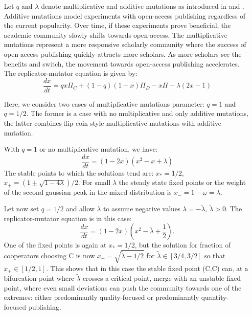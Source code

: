\documentclass[amsfonts, amssymb, prl, superscriptaddress, notitlepage, twocolumn, nofootinbib]{revtex4-2}
\begin{document}
Let $q$ and $\lambda$ denote multiplicative and additive mutations as introduced in \cite{mobilia2010oscillatory} and \cite{mittal2020evolutionary}. Additive mutations model experiments with open-access publishing regardless of the current popularity. Over time, if these experiments prove beneficial, the academic community slowly shifts towards open-access. The multiplicative mutations represent a more responsive scholarly community where the success of open-access publishing quickly attracts more scholars. As more scholars see the benefits and switch, the movement towards open-access publishing accelerates. The replicator-mutator equation is given by:
\begin{equation}
    \frac{dx}{dt} = qx\Pi_C+(1-q)(1-x)\Pi_D-x\Pi-\lambda(2x-1)
\end{equation}

Here, we consider two cases of multiplicative mutations parameter: $q=1$ and $q=1/2$. The former is a case with no multiplicative and only additive mutations, the latter combines flip coin style multiplicative mutations with additive mutation. 

With $q=1$ or no multiplicative mutation, we have:
\begin{equation}
    \frac{dx}{dt} = (1-2x)(x^2-x+\lambda)
\end{equation}
The stable points to which the solutions tend are: $x_*=1/2$, $x_{\pm}=(1\pm\sqrt{1-4\lambda})/2$. For small $\lambda$ the steady state fixed points or the weight of the second gaussian peak in the mixed distribution is $x_- =1-\omega=\lambda$.

Let now set $q=1/2$ and allow $\lambda$ to assume negative values $\lambda = -\tilde{\lambda},\, \tilde{\lambda}>0$. The replicator-mutator equation is in this case:
\begin{equation}
    \frac{dx}{dt} = (1-2x)\left(x^2-\tilde{\lambda} +\frac{1}{2}\right).
\end{equation}
One of the fixed points is again at $x_*=1/2$, but the solution for fraction of cooperators choosing C is now $x_+ = \sqrt{\tilde{\lambda}-1/2}$ for $\tilde\lambda\in [3/4,3/2]$ so that $x_+ \in [1/2,1]$. This shows that in this case the stable fixed point (C,C) can, at a bifurcation point where $\tilde\lambda$ crosses a critical point, merge with an unstable fixed point, where even small deviations can push the community towards one of the extremes: either predominantly quality-focused or predominantly quantity-focused publishing. 
\end{document}
